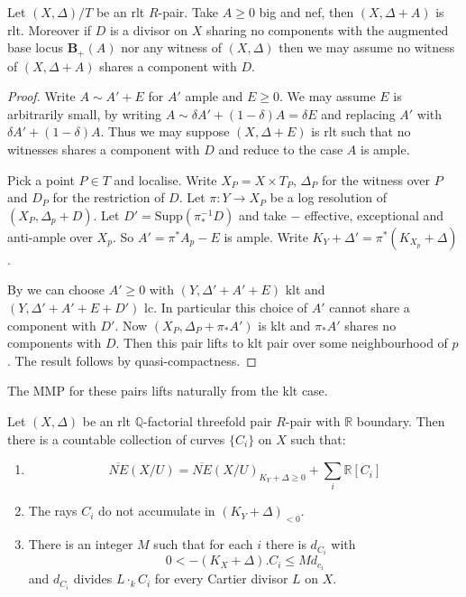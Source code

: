 \documentclass[a4paper,12pt]{amsart}
\newcommand{\BS}{\mathbf{B}_{+}}
\begin{document}
	\begin{lemma}\label{bertini}
		Let $(X,\Delta)/T$ be an rlt $R$-pair. Take $A\geq 0$ big and nef, then $(X,\Delta+A)$ is rlt. Moreover if $D$ is a divisor on $X$ sharing no components with the augmented base locus $\BS(A)$ nor any witness of $(X,\Delta)$ then we may assume no witness of $(X,\Delta+A)$ shares a component with $D$.
	\end{lemma}
	\begin{proof}
		Write $A \sim A'+E$ for $A'$ ample and $E \geq 0$. We may assume $E$ is arbitrarily small, by writing $A\sim \delta A' + (1-\delta)A=\delta E$ and replacing $A'$ with $\delta A' + (1-\delta)A$. Thus we may suppose $(X,\Delta+E)$ is rlt such that no witnesses shares a component with $D$ and reduce to the case $A$ is ample.
		
		Pick a point $P \in T$ and localise. Write $X_{P}=X \times T_{P}$, $\Delta_{P}$ for the witness over $P$ and $D_{P}$ for the restriction of $D$. Let $\pi:Y \to X_{P}$ be a log resolution of $(X_{P},\Delta_{p}+D)$. Let $D'=\text{Supp}(\pi^{-1}_{*}D)$ and take $-$ effective, exceptional and anti-ample over $X_{p}$. So $A'=\pi^{*}A_{p}-E$ is ample. Write $K_{Y}+\Delta'=\pi^{*}(K_{X_{p}}+\Delta)$.
		
		By \cite[Theorem 2.11]{bhatt2020globally+} we can choose $A'\geq 0$ with $(Y,\Delta'+A'+E)$ klt and $(Y,\Delta'+A'+E+D')$ lc. In particular this choice of $A'$ cannot share a component with $D'$. Now $(X_{P},\Delta_{P}+\pi_{*}A')$ is klt and $\pi_{*}A'$ shares no components with $D$. Then this pair lifts to klt pair over some neighbourhood of $p$. The result follows by quasi-compactness.
	\end{proof}

	The MMP for these pairs lifts naturally from the klt case.
	
	
	\begin{theorem}
		Let $(X,\Delta)$ be an rlt $\mathbb{Q}$-factorial threefold pair $R$-pair with $\mathbb{R}$ boundary. Then there is a countable collection of curves $\{C_{i}\}$ on $X$ such that:
		\begin{enumerate}
			\item $$\overline{NE}(X/U)=\overline{NE}(X/U)_{K_{Y}+\Delta \geq 0} + \sum_{i} \mathbb{R}[C_{i}]$$
			\item The rays $C_{i}$ do not accumulate in $(K_{Y}+\Delta)_{<0}$.
			\item There is an integer $M$ such that for each $i$ there is $d_{C_{i}}$ with 
			\[0 < -(K_{X}+\Delta).C_{i} \leq Md_{c_{i}}\]
			and $d_{C_{i}}$ divides $L\cdot_{k}C_{i}$ for every Cartier divisor $L$ on $X$.
		\end{enumerate}
	\end{theorem}
	
\end{document}
